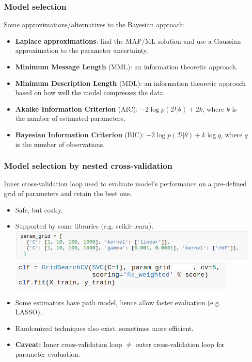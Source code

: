\begin{frame}
\frametitle{Model selection}
Some approximations/alternatives to the Bayesian approach:
\begin{itemize}
\item {\bf Laplace approximations}: find the MAP/ML solution and use a Gaussian approximation to the parameter uncertainty.
\item {\bf Minimum Message Length} (MML): an information theoretic approach.
\item {\bf Minimum Description Length} (MDL): an information theoretic approach based on how well the model compresses the data.
\item {\bf Akaike Information Criterion} (AIC): $-2\log p(\mathcal{D}|\theta) + 2 k$, where $k$ is the number of estimated parameters.
\item {\bf Bayesian Information Criterion} (BIC): $-2\log p(\mathcal{D}|\theta) + k\log q$, where $q$ is the number of observations.
\end{itemize}
\end{frame}

\begin{frame}
\frametitle{Model selection by nested cross-validation}

Inner cross-validation loop used to evaluate model's performance on a
pre-defined grid of parameters and retain the best one.

\begin{itemize}
\item Safe, but costly.
\item Supported by some libraries (e.g. scikit-learn).
\includegraphics[width=\textwidth]{sklearn_material/grid}\\
\includegraphics[width=.65\textwidth]{sklearn_material/grid_search}
\item Some estimators have path model, hence allow faster evaluation
  (e.g. LASSO).
\item Randomized techniques also exist, sometimes more efficient.
\item \textbf{Caveat:} Inner cross-validation loop $\neq$ outer
  cross-validation loop for parameter evaluation.
\end{itemize}
\end{frame}

